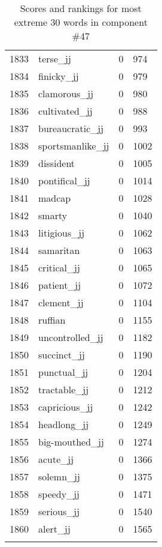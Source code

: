 \begin{longtable}[!htbp]{| rlr@{.}l |}
    1833 & terse\_jj & 0 & 974 \\
    1834 & finicky\_jj & 0 & 979 \\
    1835 & clamorous\_jj & 0 & 980 \\
    1836 & cultivated\_jj & 0 & 988 \\
    1837 & bureaucratic\_jj & 0 & 993 \\
    1838 & sportsmanlike\_jj & 0 & 1002 \\
    1839 & dissident & 0 & 1005 \\
    1840 & pontifical\_jj & 0 & 1014 \\
    1841 & madcap & 0 & 1028 \\
    1842 & smarty & 0 & 1040 \\
    1843 & litigious\_jj & 0 & 1062 \\
    1844 & samaritan & 0 & 1063 \\
    1845 & critical\_jj & 0 & 1065 \\
    1846 & patient\_jj & 0 & 1072 \\
    1847 & clement\_jj & 0 & 1104 \\
    1848 & ruffian & 0 & 1155 \\
    1849 & uncontrolled\_jj & 0 & 1182 \\
    1850 & succinct\_jj & 0 & 1190 \\
    1851 & punctual\_jj & 0 & 1204 \\
    1852 & tractable\_jj & 0 & 1212 \\
    1853 & capricious\_jj & 0 & 1242 \\
    1854 & headlong\_jj & 0 & 1249 \\
    1855 & big-mouthed\_jj & 0 & 1274 \\
    1856 & acute\_jj & 0 & 1366 \\
    1857 & solemn\_jj & 0 & 1375 \\
    1858 & speedy\_jj & 0 & 1471 \\
    1859 & serious\_jj & 0 & 1540 \\
    1860 & alert\_jj & 0 & 1565 \\
    \hline
    \caption{Scores and rankings for most extreme 30 words in component \#47} \\
\end{longtable}
